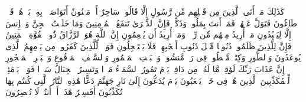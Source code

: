 كَذَٰلِكَ مَاۤ أَتَى ٱلَّذِینَ مِن قَبۡلِهِم مِّن رَّسُولٍ إِلَّا قَالُوا۟ سَاحِرٌ أَوۡ مَجۡنُونٌ%
\stopbuffer%
\startbuffer[\q:51:53]
أَتَوَاصَوۡا۟ بِهِۦۚ بَلۡ هُمۡ قَوۡمࣱ طَاغُونَ%
\stopbuffer%
\startbuffer[\q:51:54]
فَتَوَلَّ عَنۡهُمۡ فَمَاۤ أَنتَ بِمَلُومࣲ%
\stopbuffer%
\startbuffer[\q:51:55]
وَذَكِّرۡ فَإِنَّ ٱلذِّكۡرَىٰ تَنفَعُ ٱلۡمُؤۡمِنِینَ%
\stopbuffer%
\startbuffer[\q:51:56]
وَمَا خَلَقۡتُ ٱلۡجِنَّ وَٱلۡإِنسَ إِلَّا لِیَعۡبُدُونِ%
\stopbuffer%
\startbuffer[\q:51:57]
مَاۤ أُرِیدُ مِنۡهُم مِّن رِّزۡقࣲ وَمَاۤ أُرِیدُ أَن یُطۡعِمُونِ%
\stopbuffer%
\startbuffer[\q:51:58]
إِنَّ ٱللَّهَ هُوَ ٱلرَّزَّاقُ ذُو ٱلۡقُوَّةِ ٱلۡمَتِینُ%
\stopbuffer%
\startbuffer[\q:51:59]
فَإِنَّ لِلَّذِینَ ظَلَمُوا۟ ذَنُوبࣰا مِّثۡلَ ذَنُوبِ أَصۡحَٰبِهِمۡ فَلَا یَسۡتَعۡجِلُونِ%
\stopbuffer%
\startbuffer[\q:51:60]
فَوَیۡلࣱ لِّلَّذِینَ كَفَرُوا۟ مِن یَوۡمِهِمُ ٱلَّذِی یُوعَدُونَ%
\stopbuffer%
\startbuffer[\q:52:1]
وَٱلطُّورِ%
\stopbuffer%
\startbuffer[\q:52:2]
وَكِتَٰبࣲ مَّسۡطُورࣲ%
\stopbuffer%
\startbuffer[\q:52:3]
فِی رَقࣲّ مَّنشُورࣲ%
\stopbuffer%
\startbuffer[\q:52:4]
وَٱلۡبَیۡتِ ٱلۡمَعۡمُورِ%
\stopbuffer%
\startbuffer[\q:52:5]
وَٱلسَّقۡفِ ٱلۡمَرۡفُوعِ%
\stopbuffer%
\startbuffer[\q:52:6]
وَٱلۡبَحۡرِ ٱلۡمَسۡجُورِ%
\stopbuffer%
\startbuffer[\q:52:7]
إِنَّ عَذَابَ رَبِّكَ لَوَٰقِعࣱ%
\stopbuffer%
\startbuffer[\q:52:8]
مَّا لَهُۥ مِن دَافِعࣲ%
\stopbuffer%
\startbuffer[\q:52:9]
یَوۡمَ تَمُورُ ٱلسَّمَاۤءُ مَوۡرࣰا%
\stopbuffer%
\startbuffer[\q:52:10]
وَتَسِیرُ ٱلۡجِبَالُ سَیۡرࣰا%
\stopbuffer%
\startbuffer[\q:52:11]
فَوَیۡلࣱ یَوۡمَئِذࣲ لِّلۡمُكَذِّبِینَ%
\stopbuffer%
\startbuffer[\q:52:12]
ٱلَّذِینَ هُمۡ فِی خَوۡضࣲ یَلۡعَبُونَ%
\stopbuffer%
\startbuffer[\q:52:13]
یَوۡمَ یُدَعُّونَ إِلَىٰ نَارِ جَهَنَّمَ دَعًّا%
\stopbuffer%
\startbuffer[\q:52:14]
هَٰذِهِ ٱلنَّارُ ٱلَّتِی كُنتُم بِهَا تُكَذِّبُونَ%
\stopbuffer%
\startbuffer[\q:52:15]
أَفَسِحۡرٌ هَٰذَاۤ أَمۡ أَنتُمۡ لَا تُبۡصِرُونَ%
\stopbuffer%
